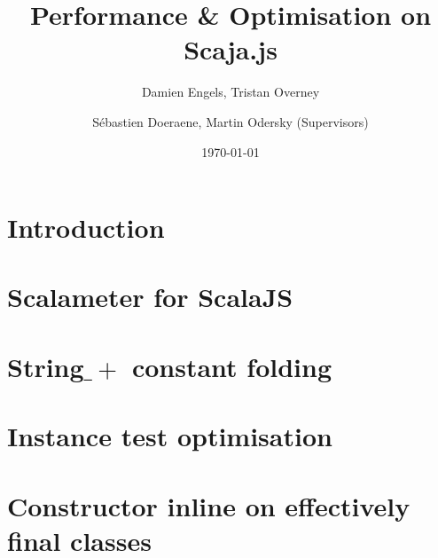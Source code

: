 \documentclass{report}
\begin{document}
\title{Performance \& Optimisation on Scaja.js}
\author{Damien Engels, Tristan Overney\and S\'{e}bastien Doeraene, Martin Odersky (Supervisors)}
\date{\today}
\maketitle

\tableofcontents

\chapter{Introduction}
\chapter{Scalameter for ScalaJS}
\chapter{String$\_+$ constant folding}
\chapter{Instance test optimisation}
\chapter{Constructor inline on effectively final classes}
\end{document}

